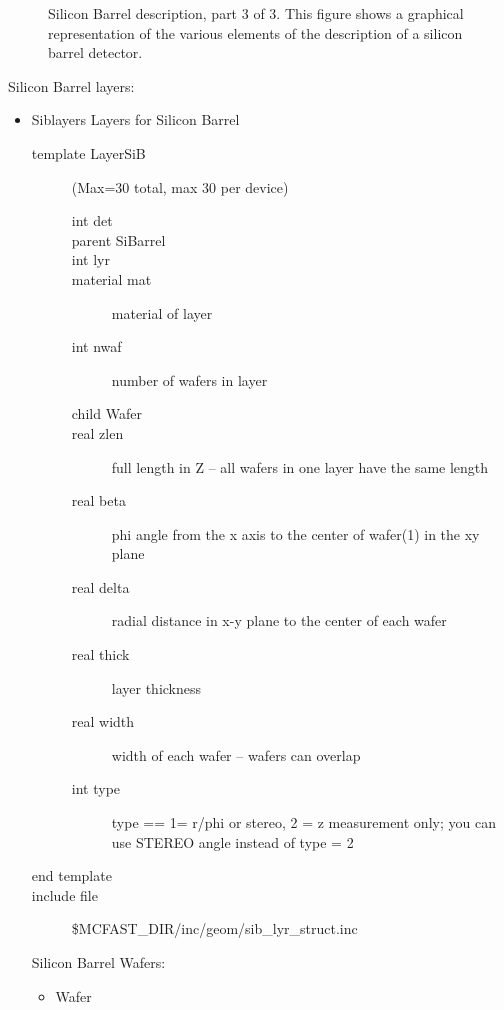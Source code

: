 \begin{figure} [htbp]
\centerline{\epsfxsize=5.0in }
\caption{\label{sib3} Silicon Barrel description, part 3 of 3.
This figure shows a graphical representation of the various elements
of the description of a silicon barrel detector.}
\end{figure}

Silicon Barrel layers:

\begin{itemize}
\item Siblayers
Layers for Silicon Barrel
\begin{description}
\item[{\rm template} LayerSiB](Max=30 total,  max 30 per device)  
\begin{description}
\item[{\rm  int} det]
\item[{\rm  parent} SiBarrel]
\item[{\rm  int} lyr]
\item[{\rm  material} mat]   material of layer
\item[{\rm  int} nwaf]       number of wafers in layer
\item[{\rm  child} Wafer]
\item[{\rm  real} zlen]      full length in Z  -- all wafers in one layer have
the same length
\item[{\rm  real} beta]      phi angle from the x axis to the center of wafer(1)
in the xy plane
\item[{\rm  real} delta]     radial distance in x-y plane to the center of each wafer 
\item[{\rm  real} thick]     layer thickness
\item[{\rm  real} width]     width of each wafer -- wafers can overlap
\item[{\rm  int} type]       type == 1= r/phi or stereo, 2 = z measurement
only;     you can use STEREO angle instead of type = 2
\end{description}
\item[end template]
\item[include file] \$MCFAST\_DIR/inc/geom/sib\_lyr\_struct.inc 
\end{description}

Silicon Barrel Wafers:

\begin{itemize}
\item Wafer \\


\end{itemize}
\end{itemize}
